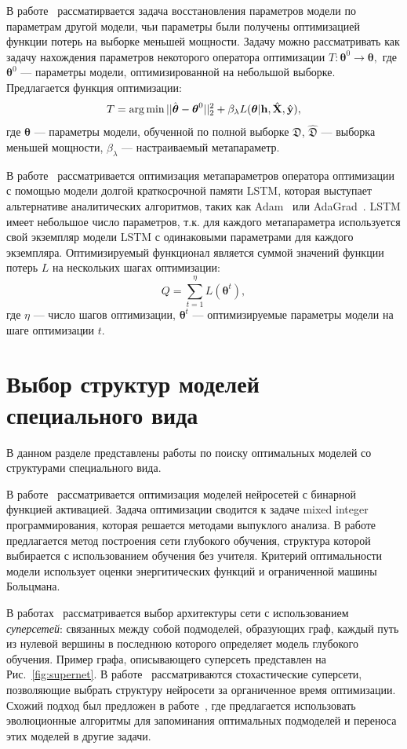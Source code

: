В работе~\cite{l2l} рассматирвается задача восстановления параметров модели по параметрам  другой модели, чьи параметры были получены оптимизацией функции потерь на выборке меньшей мощности. Задачу можно рассматривать как задачу нахождения параметров некоторого оператора оптимизации $T:\boldsymbol{\theta}^0 \to \boldsymbol{\theta},$ где $\boldsymbol{\theta}^0$ --- параметры модели, оптимизированной на небольшой выборке.  Предлагается функция оптимизации:
\[
    T = \operatorname*{arg\,min} ||\hat{\boldsymbol{\theta}} -  \boldsymbol{\theta}^0||_2^2 + \beta_{\lambda} L(\boldsymbol{\theta}|  \mathbf{h},  \hat{\mathbf{X}}, \hat{\mathbf{y}}),
\]
где $\boldsymbol{\theta}$ --- параметры модели, обученной по полной выборке $\mathfrak{D}$, $\hat{\mathfrak{D}}$ --- выборка меньшей мощности, $\beta_{\lambda}$ --- настраиваемый метапараметр.

В работе~\cite{l2l_by_gd_gd} рассматривается оптимизация метапараметров оператора оптимизации с помощью модели долгой краткосрочной памяти LSTM, которая выступает альтернативе аналитических алгоритмов, таких как Adam~\cite{adam} или AdaGrad~\cite{adagrad}. LSTM имеет небольшое число параметров, т.к. для каждого метапараметра используется свой экземпляр модели LSTM с одинаковыми параметрами для каждого экземпляра. Оптимизируемый функционал является суммой значений функции потерь $L$ на нескольких шагах оптимизации:
\[
   Q = \sum_{t=1}^\eta L(\boldsymbol{\theta}^t),
\]
где $\eta$ --- число шагов оптимизации, $\boldsymbol{\theta}^t$ --- оптимизируемые параметры модели на шаге оптимизации $t$.


\section{Выбор структур моделей специального вида}
В данном разделе представлены работы по поиску оптимальных моделей со структурами специального вида.

В работе~\cite{mixed} рассматривается оптимизация моделей нейросетей с бинарной функцией активацией. Задача оптимизации сводится к задаче mixed integer программирования, которая решается методами выпуклого анализа.
В работе~\cite{energynet} предлагается метод построения сети глубокого обучения, структура которой выбирается с использованием обучения без учителя. Критерий оптимальности модели использует оценки энергитических функций и ограниченной машины Больцмана.

В работах~\cite{pathnet, supernet} рассматривается выбор архитектуры сети с использованием \textit{суперсетей}: связанных между собой подмоделей, образующих граф, каждый  путь из нулевой вершины в последнюю которого определяет модель глубокого обучения. Пример графа, описывающего суперсеть представлен на Рис.~\ref{fig:supernet}. В работе~\cite{supernet} рассматриваются стохастические суперсети, позволяющие выбрать структуру нейросети за органиченное время оптимизации. 
Схожий подход был предложен в работе~\cite{pathnet}, где предлагается использовать эволюционные алгоритмы для запоминания оптимальных подмоделей и переноса этих моделей в другие задачи.


